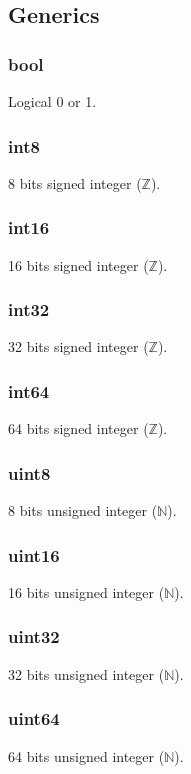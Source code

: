 \documentclass[12pt, titlepage]{article}
\begin{document}
\subsection{Generics} \label{sec:generics}

\subsubsection{bool}\label{generic:bool} Logical 0 or 1.

\subsubsection{int8}\label{generic:int8} 8 bits signed integer ($\mathbb{Z}$).

\subsubsection{int16}\label{generic:int16} 16 bits signed integer
($\mathbb{Z}$).

\subsubsection{int32}\label{generic:int32} 32 bits signed integer
($\mathbb{Z}$).

\subsubsection{int64}\label{generic:int64} 64 bits signed integer
($\mathbb{Z}$).

\subsubsection{uint8}\label{generic:uint8} 8 bits unsigned integer
($\mathbb{N}$).

\subsubsection{uint16}\label{generic:uint16} 16 bits unsigned integer
($\mathbb{N}$).

\subsubsection{uint32}\label{generic:uint32} 32 bits unsigned integer
($\mathbb{N}$).

\subsubsection{uint64}\label{generic:uint64} 64 bits unsigned integer
($\mathbb{N}$).
\end{document}
